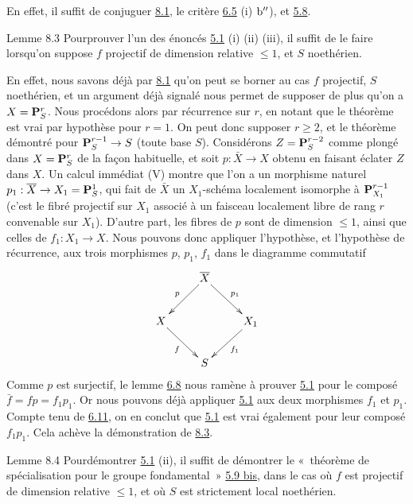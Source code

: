 \documentclass[10pt]{../fichiers-configuration-latex/smfart}
\begin{document}
En effet, il suffit de conjuguer \hyperref[XII.lem8.1]{8.1}, le critère \hyperref[XII.prop6.5]{6.5} (i) ${\rm b''}$), et \hyperref[XII.lem5.8]{5.8}.

\begin{enonce*}{Lemme 8.3}
Pour\pageoriginale prouver l'un des énoncés {\rm \hyperref[XII.thm5.1]{5.1} (i) (ii) (iii)},
il suffit de le faire lorsqu'on suppose $f$ projectif de dimension
relative $\leq 1$, et $S$ noethérien.
\end{enonce*}

En effet, nous savons déjà par \hyperref[XII.lem8.1]{8.1} qu'on peut se borner au cas $f$
projectif, $S$ noethérien, et un argument déjà signalé nous permet de
supposer de plus qu'on a $X=\mathbf{P}^r_S$. Nous procédons alors par
récurrence sur $r$, en notant que le théorème est vrai par hypothèse
pour $r=1$. On peut donc supposer $r\geq 2$, et le théorème démontré
pour $\mathbf{P}^{r-1}_S\rightarrow S$ (toute base $S$). Considérons
$Z=\mathbf{P}^{r-2}_S$ comme plongé dans $X=\mathbf{P}^r_S$ de la façon
habituelle, et soit $p:\bar{X}\rightarrow X$ obtenu en faisant éclater
$Z$ dans $X$. Un calcul immédiat (\cf \EGA V) montre que l'on a un
morphisme naturel $p_1:\overline{X}\rightarrow X_1=\mathbf{P}^1_S$, qui fait de
$\bar{X}$ un $X_1$-schéma localement isomorphe à $\mathbf{P}^{r-1}_{X_1}$
(c'est le fibré projectif sur $X_1$ associé à un faisceau localement
libre de rang $r$ convenable sur $X_1$). D'autre part, les fibres de
$p$ sont de dimension $\leq 1$, ainsi que celles de
$f_1:X_1\rightarrow X$. Nous pouvons donc appliquer l'hypothèse, et
l'hypothèse de récurrence, aux trois morphismes $p$, $p_1$, $f_1$ dans
le diagramme commutatif
$$
\xymatrix{
   & \bar{X} \ar[ld]_{p} \ar[rd]^{p_1} &          \\
 X \ar[rd]_{f}&           & X_1\ar[ld]^{f_1}\\
   &    S      &       
}$$
Comme $p$ est surjectif, le lemme \hyperref[XII.prop6.8]{6.8} nous ramène à prouver \hyperref[XII.thm5.1]{5.1} pour
le composé $\bar{f}=fp=f_1p_1$. Or nous pouvons déjà appliquer \hyperref[XII.thm5.1]{5.1} aux
deux morphismes $f_1$ et $p_1$. Compte tenu de \hyperref[XII.prop6.11]{6.11}, on en conclut que
\hyperref[XII.thm5.1]{5.1} est vrai également pour leur composé $f_1p_1$. Cela achève la
démonstration de \hyperref[XII.lem8.3]{8.3}.

\begin{enonce*}{Lemme 8.4}
Pour\pageoriginale démontrer {\rm \hyperref[XII.thm5.1]{5.1} (ii)}, il suffit de
démontrer le 
« théorème de spécialisation pour le groupe fondamental » {\rm
\hyperref[XII.thmbis5.9]{5.9 bis}}, dans le cas où $f$ est projectif de
dimension relative $\leq 
  1$, et où $S$ est strictement local noethérien.
\end{enonce*}
\end{document}

